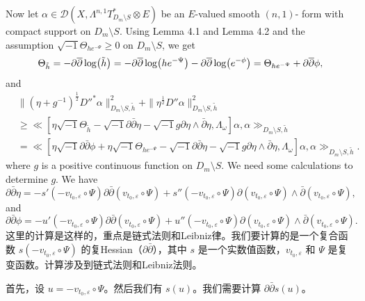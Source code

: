 Now let $\alpha\in \mathcal{D}(X,\Lambda^{n,1}T_{D_{m}\setminus
S}^{*}\otimes E)$ be an $E$-valued smooth $(n,1)$- form with compact
support on $D_{m}\setminus S$. Using Lemma 4.1 and Lemma
4.2 and the assumption $\sqrt{-1}\Theta_{he^{-\Psi}}\geq
0$ on $D_{m}\setminus S$, we get
\begin{align*}
  \Theta_{\tilde{h}} =-\partial\overline{\partial}\log (\tilde{h})=-\partial\overline{\partial}\log(he^{-\Psi})-\partial\overline{\partial}\log(e^{-\phi}) 
  =\Theta_{he^{-\Psi}}+\partial\overline{\partial}\phi,
\end{align*}
and
\begin{equation}
\label{equ:smooth.3.31.1}
\begin{split}
&\|(\eta+g^{-1})^{\frac{1}{2}}D''^{*}\alpha\|^{2}_{D_m\setminus S,\tilde{h}}
+\|\eta^{\frac{1}{2}}D''\alpha\|^{2}_{D_m\setminus S,\tilde{h}}
\\&\geq\ll[\eta\sqrt{-1}\Theta_{\tilde{h}}-\sqrt{-1}\partial\bar\partial\eta-
\sqrt{-1}g\partial\eta\wedge\bar\partial\eta,\Lambda_{\omega}]\alpha,\alpha\gg_{D_m\setminus S,\tilde{h}}
\\&=\ll[\eta\sqrt{-1}\partial\bar\partial\phi+\eta\sqrt{-1}\Theta_{he^{-\Psi}}-\sqrt{-1}\partial\bar\partial\eta-
\sqrt{-1}g\partial\eta\wedge\bar\partial\eta,\Lambda_{\omega}]\alpha,\alpha\gg_{D_m\setminus S,\tilde{h}}.
\end{split}
\end{equation}
where $g$ is a positive continuous function on $D_{m}\setminus S$.
We need some calculations to determine $g$. We have
\begin{equation}
\partial\bar{\partial}\eta=-s'(-v_{t_0,\varepsilon}\circ \Psi)\partial\bar{\partial}(v_{t_0,\varepsilon}\circ \Psi)
+s''(-v_{t_0,\varepsilon}\circ \Psi)\partial(v_{t_0,\varepsilon}\circ \Psi)\wedge
\bar{\partial}(v_{t_0,\varepsilon}\circ \Psi),
\end{equation}
and
\begin{equation}
\partial\bar{\partial}\phi=-u'(-v_{t_0,\varepsilon}\circ \Psi)\partial\bar{\partial}(v_{t_0,\varepsilon}\circ \Psi)
+
u''(-v_{t_0,\varepsilon}\circ \Psi)\partial(v_{t_0,\varepsilon}\circ \Psi)
\wedge\bar{\partial}(v_{t_0,\varepsilon}\circ \Psi).
\end{equation}
这里的计算是这样的，重点是链式法则和Leibniz律。我们要计算的是一个复合函数 \(s(-v_{t_0,\varepsilon} \circ \Psi)\) 的复Hessian（\(\partial\bar{\partial}\)），其中 \(s\) 是一个实数值函数，\(v_{t_0,\varepsilon}\) 和 \(\Psi\) 是复变函数。计算涉及到链式法则和Leibniz法则。

首先，设 \(u = -v_{t_0,\varepsilon} \circ \Psi\)。然后我们有 \(s(u)\)。我们需要计算 \(\partial\bar{\partial}s(u)\)。

